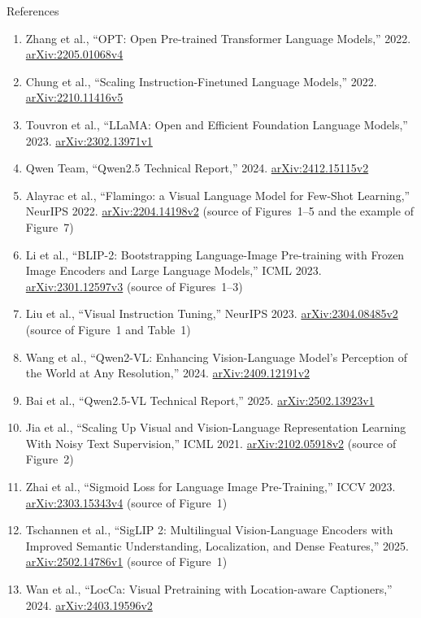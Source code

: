 \begin{frame}[allowframebreaks]{References}
\begin{enumerate}
    \item Zhang et al., ``OPT: Open Pre-trained Transformer Language Models,'' 2022. \href{https://arxiv.org/abs/2205.01068v4}{arXiv:2205.01068v4}
    \item Chung et al., ``Scaling Instruction-Finetuned Language Models,'' 2022. \href{https://arxiv.org/abs/2210.11416v5}{arXiv:2210.11416v5}
    \item Touvron et al., ``LLaMA: Open and Efficient Foundation Language Models,'' 2023. \href{https://arxiv.org/abs/2302.13971v1}{arXiv:2302.13971v1}
    \item Qwen Team, ``Qwen2.5 Technical Report,'' 2024. \href{https://arxiv.org/abs/2412.15115v2}{arXiv:2412.15115v2}
    \item Alayrac et al., ``Flamingo: a Visual Language Model for Few-Shot Learning,'' NeurIPS 2022. \href{https://arxiv.org/abs/2204.14198v2}{arXiv:2204.14198v2} (source of Figures~1--5 and the example of Figure~7)
    \item Li et al., ``BLIP-2: Bootstrapping Language-Image Pre-training with Frozen Image Encoders and Large Language Models,'' ICML 2023. \href{https://arxiv.org/abs/2301.12597v3}{arXiv:2301.12597v3} (source of Figures~1--3)
    \item Liu et al., ``Visual Instruction Tuning,'' NeurIPS 2023. \href{https://arxiv.org/abs/2304.08485v2}{arXiv:2304.08485v2} (source of Figure~1 and Table~1)
    \item Wang et al., ``Qwen2-VL: Enhancing Vision-Language Model's Perception of the World at Any Resolution,'' 2024. \href{https://arxiv.org/abs/2409.12191v2}{arXiv:2409.12191v2}
    \item Bai et al., ``Qwen2.5-VL Technical Report,'' 2025. \href{https://arxiv.org/abs/2502.13923v1}{arXiv:2502.13923v1}
    \item Jia et al., ``Scaling Up Visual and Vision-Language Representation Learning With Noisy Text Supervision,'' ICML 2021. \href{https://arxiv.org/abs/2102.05918v2}{arXiv:2102.05918v2} (source of Figure~2)
    \item Zhai et al., ``Sigmoid Loss for Language Image Pre-Training,'' ICCV 2023. \href{https://arxiv.org/abs/2303.15343v4}{arXiv:2303.15343v4} (source of Figure~1)
    \item Tschannen et al., ``SigLIP 2: Multilingual Vision-Language Encoders with Improved Semantic Understanding, Localization, and Dense Features,'' 2025. \href{https://arxiv.org/abs/2502.14786v1}{arXiv:2502.14786v1} (source of Figure~1)
    \item Wan et al., ``LocCa: Visual Pretraining with Location-aware Captioners,'' 2024. \href{https://arxiv.org/abs/2403.19596v2}{arXiv:2403.19596v2}

\end{enumerate}
\end{frame}

